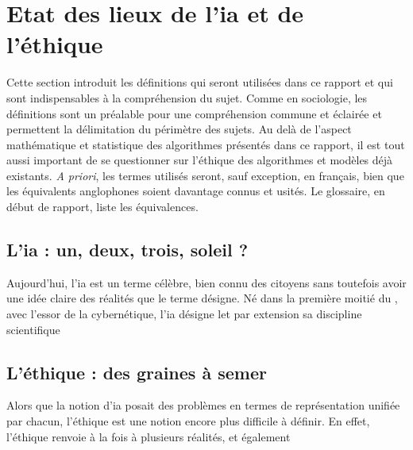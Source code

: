 \section{Etat des lieux de l'\gls{ia} et de l'éthique}

Cette section introduit les définitions qui seront utilisées dans ce rapport et qui sont indispensables à la compréhension du sujet. Comme en sociologie, les définitions sont un préalable pour une compréhension commune et éclairée et permettent la délimitation du périmètre des sujets. Au delà de l'aspect mathématique et statistique des algorithmes présentés dans ce rapport, il est tout aussi important de se questionner sur l'éthique des algorithmes et modèles déjà existants. \textit{A priori}, les termes utilisés seront, sauf exception, en français, bien que les équivalents anglophones soient davantage connus et usités. Le glossaire, en début de rapport, liste les équivalences.

\subsection{L'\gls{ia} : un, deux, trois, soleil ?}

Aujourd'hui, l'\gls{ia} est un terme célèbre, bien connu des citoyens sans toutefois avoir une idée claire des réalités que le terme désigne. Né dans la première moitié du , avec l'essor de la cybernétique, l'\gls{ia} désigne let par extension sa discipline scientifique

\subsection{L'éthique : des graines à semer}

Alors que la notion d'\gls{ia} posait des problèmes en termes de représentation unifiée par chacun, l'éthique est une notion encore plus difficile à définir. En effet, l'éthique renvoie à la fois à plusieurs réalités, et également
\cite{ethique-cnil}
\pagebreak